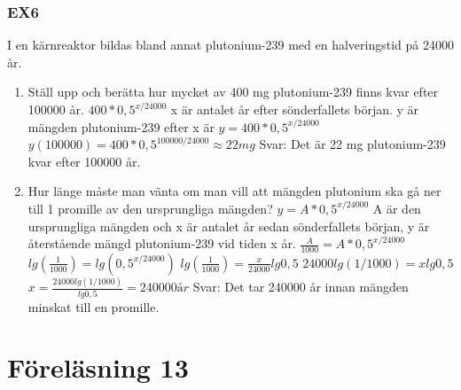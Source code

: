 \documentclass[a4paper,10pt]{article}
\begin{document}
\begin{flushleft}
\subsubsection{EX6}
  I en kärnreaktor bildas bland annat plutonium-239 med en halveringstid på 24000 år.
  \begin{enumerate}
    \item Ställ upp och berätta hur mycket av 400 mg plutonium-239 finns kvar efter 100000 år.\newline
    $ 400*0,5^{x/24000} $\newline
    x är antalet år efter sönderfallets början. y är mängden plutonium-239 efter x är
    $ y = 400*0,5^{x/24000} $\newline
    $ y(100000) = 400*0,5^{100000/24000}\approx22mg $
    Svar: Det är 22 mg plutonium-239 kvar efter 100000 år.
    \item Hur länge måste man vänta om man vill att mängden plutonium ska gå ner till 1 promille av den ursprungliga mängden?\newline
    $ y = A*0,5^{x/24000} $\newline
    A är den ursprungliga mängden och x är antalet år sedan sönderfallets början, y är återstående mängd plutonium-239 vid tiden x år.
    $ \frac{A}{1000} = A*0,5^{x/24000} $\newline
    $ lg(\frac{1}{1000}) = lg(0,5^{x/24000}) $\newline
    $ lg(\frac{1}{1000}) = \frac{x}{24000}lg0,5 $\newline
    $ 24000lg(1/1000) = xlg0,5 $\newline
    $ x = \frac{24000lg(1/1000)}{lg0,5} = 240000år $\newline
    Svar: Det tar 240000 år innan mängden minskat till en promille.
  \end{enumerate}

\section{Föreläsning 13}

\end{flushleft}
\end{document}
